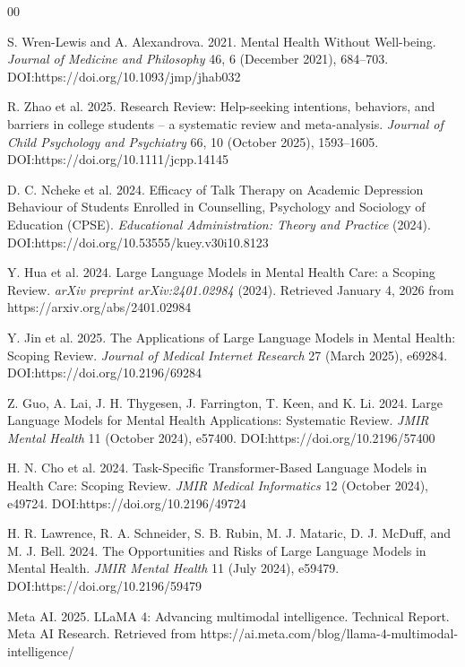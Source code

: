 ﻿\documentclass[acmsmall,screen]{acmart}
\begin{document}
\begin{thebibliography}{00}

 S. Wren-Lewis and A. Alexandrova. 2021. Mental Health Without Well-being. \textit{Journal of Medicine and Philosophy} 46, 6 (December 2021), 684--703. DOI:https://doi.org/10.1093/jmp/jhab032 

 R. Zhao et al. 2025. Research Review: Help-seeking intentions, behaviors, and barriers in college students -- a systematic review and meta-analysis. \textit{Journal of Child Psychology and Psychiatry} 66, 10 (October 2025), 1593--1605. DOI:https://doi.org/10.1111/jcpp.14145 

 D. C. Ncheke et al. 2024. Efficacy of Talk Therapy on Academic Depression Behaviour of Students Enrolled in Counselling, Psychology and Sociology of Education (CPSE). \textit{Educational Administration: Theory and Practice} (2024). DOI:https://doi.org/10.53555/kuey.v30i10.8123

 Y. Hua et al. 2024. Large Language Models in Mental Health Care: a Scoping Review. \textit{arXiv preprint arXiv:2401.02984} (2024). Retrieved January 4, 2026 from https://arxiv.org/abs/2401.02984 

 Y. Jin et al. 2025. The Applications of Large Language Models in Mental Health: Scoping Review. \textit{Journal of Medical Internet Research} 27 (March 2025), e69284. DOI:https://doi.org/10.2196/69284 

 Z. Guo, A. Lai, J. H. Thygesen, J. Farrington, T. Keen, and K. Li. 2024. Large Language Models for Mental Health Applications: Systematic Review. \textit{JMIR Mental Health} 11 (October 2024), e57400. DOI:https://doi.org/10.2196/57400 

 H. N. Cho et al. 2024. Task-Specific Transformer-Based Language Models in Health Care: Scoping Review. \textit{JMIR Medical Informatics} 12 (October 2024), e49724. DOI:https://doi.org/10.2196/49724 

 H. R. Lawrence, R. A. Schneider, S. B. Rubin, M. J. Mataric, D. J. McDuff, and M. J. Bell. 2024. The Opportunities and Risks of Large Language Models in Mental Health. \textit{JMIR Mental Health} 11 (July 2024), e59479. DOI:https://doi.org/10.2196/59479 

 Meta AI. 2025. LLaMA 4: Advancing multimodal intelligence. Technical Report. Meta AI Research. Retrieved from https://ai.meta.com/blog/llama-4-multimodal-intelligence/


\end{thebibliography}
\end{document}
